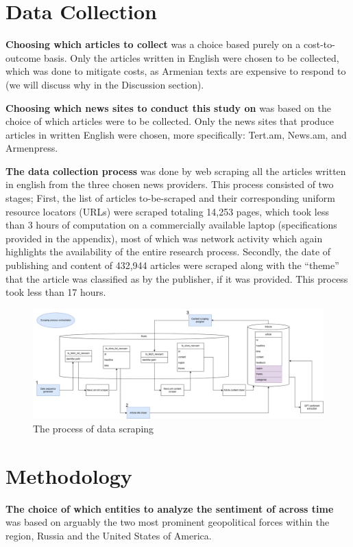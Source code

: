 \documentclass{IEEEtran}
\begin{document}
\section{Data Collection}

\textbf{Choosing which articles to collect} was a choice based purely on a cost-to-outcome basis. Only the articles written in English were chosen to be collected, which was done to mitigate costs, as Armenian texts are expensive to respond to (we will discuss why in the Discussion section).

\textbf{Choosing which news sites to conduct this study on} was based on the choice of which articles were to be collected. Only the news sites that produce articles in written English were chosen, more specifically: Tert.am, News.am, and Armenpress.

\textbf{The data collection process} was done by web scraping all the articles written in english from the three chosen news providers. This process consisted of two stages; First, the list of articles to-be-scraped and their corresponding uniform resource locators (URLs) were scraped totaling 14,253 pages, which took less than 3 hours of computation on a commercially available laptop (specifications provided in the appendix), most of which was network activity which again highlights the availability of the entire research process. Secondly, the date of publishing and content of 432,944 articles were scraped along with the “theme” that the article was classified as by the publisher, if it was provided. This process took less than 17 hours.


\begin{figure}
    \centering
    \includegraphics[width=1\linewidth]{flow.drawio.png}
    \caption{The process of data scraping}
    \label{fig:flow}
\end{figure}

\hspace

\section{Methodology}
\textbf{The choice of which entities to analyze the sentiment of across time} was based on arguably the two most prominent geopolitical forces within the region, Russia and the United States of America.
\end{document}
